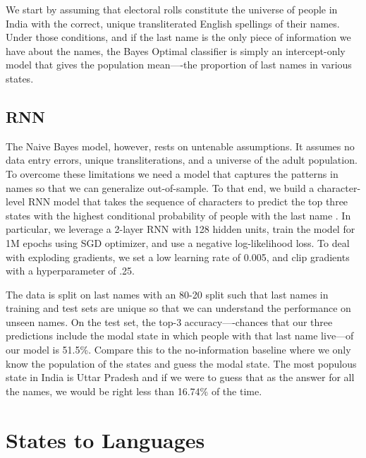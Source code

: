 \documentclass[11pt,  letterpaper]{article}
\begin{document}
We start by assuming that electoral rolls constitute the universe of people in India with the correct, unique transliterated English spellings of their names. Under those conditions, and if the last name is the only piece of information we have about the names, the Bayes Optimal classifier is simply an intercept-only model that gives the population mean—-the proportion of last names in various states. 

\subsection{RNN}

The Naive Bayes model, however, rests on untenable assumptions. It assumes no data entry errors, unique transliterations, and a universe of the adult population. To overcome these limitations we need a model that captures the patterns in names so that we can generalize out-of-sample. To that end, we build a character-level RNN model that takes the sequence of characters to predict the top three states with the highest conditional probability of people with the last name \citep{10.1145/3426826.3426842, 8469258}. In particular, we leverage a 2-layer RNN with 128 hidden units, train the model for 1M epochs using SGD optimizer, and use a negative log-likelihood loss. To deal with exploding gradients, we set a low learning rate of 0.005, and clip gradients with a hyperparameter of .25.

The data is split on last names with an 80-20 split such that last names in training and test sets are unique so that we can understand the performance on unseen names. On the test set, the top-3 accuracy—-chances that our three predictions include the modal state in which people with that last name live—of our model is 51.5\%. Compare this to the no-information baseline where we only know the population of the states and guess the modal state. The most populous state in India is Uttar Pradesh and if we were to guess that as the answer for all the names, we would be right less than 16.74\% of the time.

\section{States to Languages}
\end{document}
